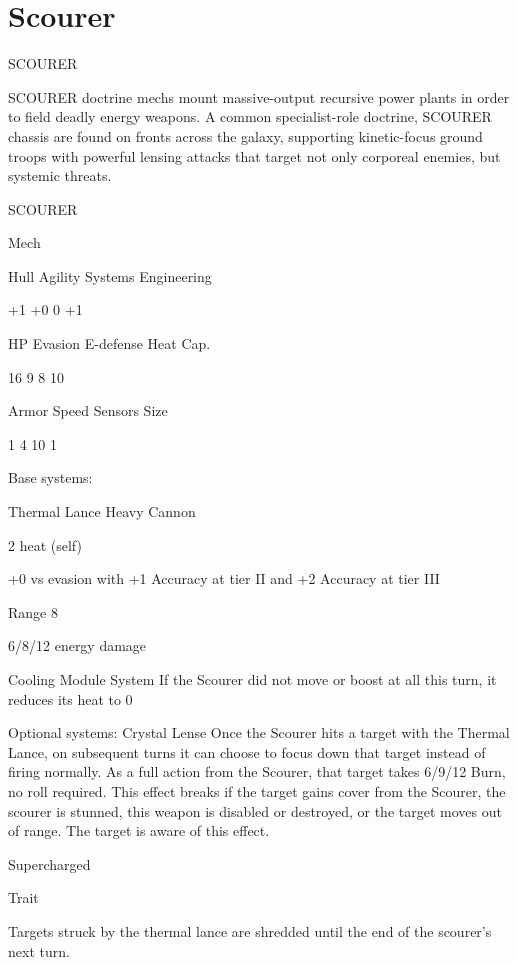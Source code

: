 \section{Scourer}

                                              SCOURER

SCOURER doctrine mechs mount massive-output recursive power plants in order to field deadly
energy weapons. A common specialist-role doctrine, SCOURER chassis are found on fronts
across the galaxy, supporting kinetic-focus ground troops with powerful lensing attacks that
target not only corporeal enemies, but systemic threats.


 SCOURER

 Mech

 Hull       Agility     Systems       Engineering

 +1         +0           0            +1

 HP         Evasion      E-defense    Heat Cap.

 16         9            8            10

 Armor      Speed       Sensors       Size

 1          4            10           1

Base systems:

Thermal Lance
Heavy Cannon

2 heat (self)

+0 vs evasion with +1 Accuracy at tier II and +2 Accuracy at tier III

Range 8

6/8/12 energy damage


Cooling Module
System
If the Scourer did not move or boost at all this turn, it reduces its heat to 0


Optional systems:
Crystal Lense
Once the Scourer hits a target with the Thermal Lance, on subsequent turns it can choose to
focus down that target instead of firing normally. As a full action from the Scourer, that target
takes 6/9/12 Burn, no roll required. This effect breaks if the target gains cover from the Scourer,
the scourer is stunned, this weapon is disabled or destroyed, or the target moves out of range.
The target is aware of this effect.


Supercharged

Trait





Targets struck by the thermal lance are shredded until the end of the scourer’s next turn.


